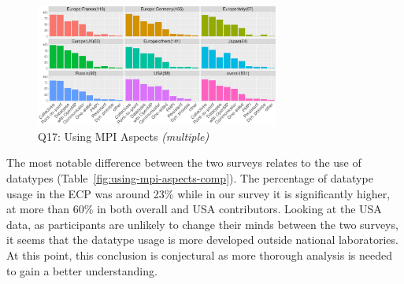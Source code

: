 \documentclass[preprint,5p,times]{elsarticle}
\begin{document}
\begin{figure}[tb]
  \begin{center}
    \includegraphics[width=8.0cm]{R-scripts/Q17.pdf}
    \vspace{-1.5mm}
    \caption{Q17: Using MPI Aspects {\it(multiple)}}
    \label{fig:using-mpi-aspects}
\vspace{-3mm}%
  \end{center}
\end{figure}

The most notable difference between the two surveys relates to the use of
datatypes (Table~\ref{fig:using-mpi-aspects-comp}). The percentage of datatype usage
in the ECP was around 23\% while in our survey it is significantly higher, at
more than 60\% in both overall and USA contributors.
%
Looking at the USA data, as participants are unlikely to change their
minds between the two surveys, it seems that the
datatype usage is more developed outside national laboratories. At this
point, this conclusion is conjectural as more thorough analysis is needed to gain a
better understanding.
\end{document}
